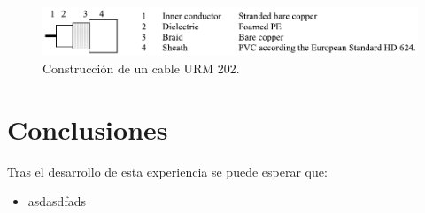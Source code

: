 \documentclass[11pt,onecolumn]{article}
\begin{document}
\begin{figure}[H]
\centering
\includegraphics[scale=1]{img/URM202.pdf}
\caption{Construcción de un cable URM 202.}
\label{urm202}
\end{figure}














\newpage
\section{Conclusiones}

Tras el desarrollo de esta experiencia se puede esperar que:
\begin{itemize}
\item asdasdfads

\end{itemize}
\end{document}
